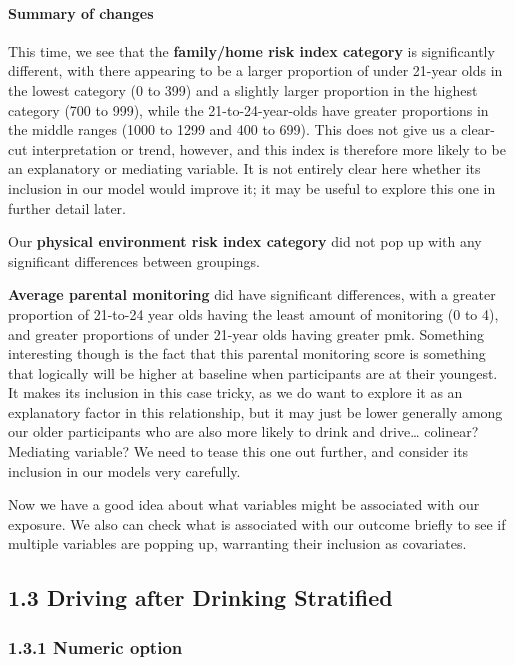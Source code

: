 \documentclass[
]{article}
\begin{document}
\paragraph{Summary of changes}\label{summary-of-changes}

This time, we see that the \textbf{family/home risk index category} is
significantly different, with there appearing to be a larger proportion
of under 21-year olds in the lowest category (0 to 399) and a slightly
larger proportion in the highest category (700 to 999), while the
21-to-24-year-olds have greater proportions in the middle ranges (1000
to 1299 and 400 to 699). This does not give us a clear-cut
interpretation or trend, however, and this index is therefore more
likely to be an explanatory or mediating variable. It is not entirely
clear here whether its inclusion in our model would improve it; it may
be useful to explore this one in further detail later.

Our \textbf{physical environment risk index category} did not pop up
with any significant differences between groupings.

\textbf{Average parental monitoring} did have significant differences,
with a greater proportion of 21-to-24 year olds having the least amount
of monitoring (0 to 4), and greater proportions of under 21-year olds
having greater pmk. Something interesting though is the fact that this
parental monitoring score is something that logically will be higher at
baseline when participants are at their youngest. It makes its inclusion
in this case tricky, as we do want to explore it as an explanatory
factor in this relationship, but it may just be lower generally among
our older participants who are also more likely to drink and
drive\ldots{} colinear? Mediating variable? We need to tease this one
out further, and consider its inclusion in our models very carefully.

Now we have a good idea about what variables might be associated with
our exposure. We also can check what is associated with our outcome
briefly to see if multiple variables are popping up, warranting their
inclusion as covariates.

\subsection{1.3 Driving after Drinking
Stratified}\label{driving-after-drinking-stratified}

\subsubsection{1.3.1 Numeric option}\label{numeric-option-1}
\end{document}
